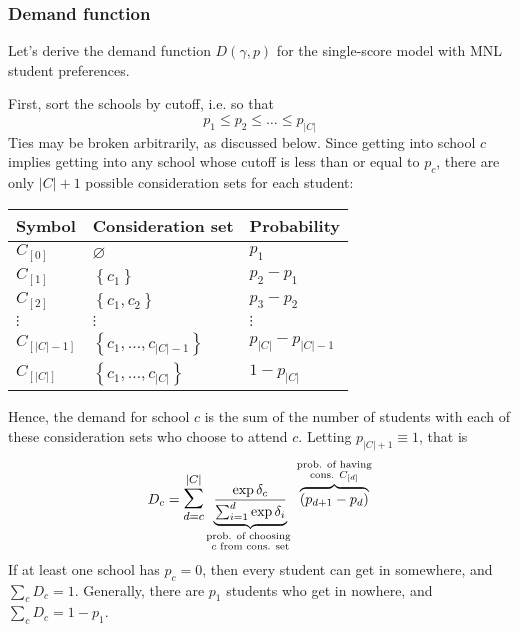 \documentclass[12pt]{article}
\theoremstyle{definition}
\begin{document}
\subsubsection{Demand function}
Let's derive the demand function $D(\gamma, p)$ for the single-score model with MNL student preferences.

First, sort the schools by cutoff, i.e. so that
\[p_1 \leq p_2 \leq \dots \leq p_{|C|}\]
Ties may be broken arbitrarily, as discussed below. Since getting into school $c$ implies getting into any school whose cutoff is less than or equal to $p_c$, there are only $|C| + 1$ possible consideration sets for each student: 
\begin{center}
\begin{tabular}{lll}
\textbf{Symbol} & \textbf{Consideration set} & \textbf{Probability} \\ \hline
$C_{[0]}$    & $\varnothing$    & $p_1$                  \\
$C_{[1]}$    & $\left\{ c_1 \right\}$    & $p_2 - p_1$               \\
$C_{[2]}$    & $\left\{ c_1, c_2 \right\}$    & $p_3 - p_2$               \\
$\vdots$ & $\vdots$ & $\vdots$ \\
$C_{[|C| - 1]}$           & $\left\{ c_1, \dots, c_{|C| - 1} \right\}$     & $p_{|C|} - p_{|C|-1}$             \\
$C_{[|C|]}$           & $\left\{ c_1, \dots, c_{|C|} \right\}$     & $1 - p_{|C|}$                 
\end{tabular}
\end{center}
Hence, the demand for school $c$ is the sum of the number of students with each of these consideration sets who choose to attend $c$. Letting $p_{|C|+1} \equiv 1$, that is
\begin{equation}D_c = \mathlarger{\mathlarger{\sum}}_{d=c}^{|C|} 
\underbrace{\frac{\exp{\delta_c}}{ \sum_{i=1}^d \exp{\delta_i}}}_{\substack{\text{prob. of choosing  }\\ c\text{ from cons. set}}} 
\overbrace{\left(p_{d+1} - p_{d}\right)}^{\substack{\text{prob. of having}\\ \text{cons. }C_{[d]}}} 
\label{mnlonetestdemand}\end{equation}
If at least one school has $p_c = 0$, then every student can get in somewhere, and $\sum_c D_c = 1$. Generally, there are $p_1$ students who get in nowhere, and $\sum_c D_c = 1 - p_1$.
\end{document}
